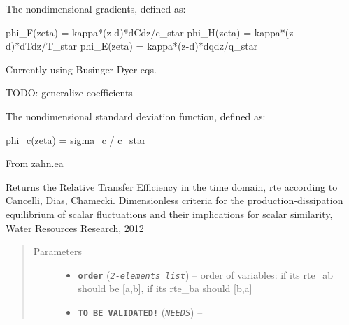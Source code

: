 \documentclass[a4paper,10pt,oneside]{sphinxmanual}
\begin{document}

\begin{fulllineitems}
\label{pymicra.micro:pymicra.micro.functions.nondimensionalGrad}
The nondimensional gradients, defined as:

phi\_F(zeta) = kappa*(z-d)*dCdz/c\_star
phi\_H(zeta) = kappa*(z-d)*dTdz/T\_star
phi\_E(zeta) = kappa*(z-d)*dqdz/q\_star

Currently using Businger-Dyer eqs.

TODO: generalize coefficients

\end{fulllineitems}


\begin{fulllineitems}
\label{pymicra.micro:pymicra.micro.functions.nondimensionalSTD}
The nondimensional standard deviation function, defined as:

phi\_c(zeta) = sigma\_c / c\_star

From zahn.ea

\end{fulllineitems}


\begin{fulllineitems}
\label{pymicra.micro:pymicra.micro.functions.rte}
Returns the Relative Transfer Efficiency in the time domain, rte
according to Cancelli, Dias, Chamecki. Dimensionless criteria for the production-dissipation equilibrium
of scalar fluctuations and their implications for scalar similarity, Water Resources Research, 2012
\begin{quote}\begin{description}
\item[{Parameters}] \leavevmode\begin{itemize}
\item {} 
\textbf{\texttt{order}} (\emph{\texttt{2-elements list}}) -- order of variables: if its rte\_ab should be {[}a,b{]}, if its rte\_ba should {[}b,a{]}

\item {} 
\textbf{\texttt{TO BE VALIDATED!}} (\emph{\texttt{NEEDS}}) -- 

\end{itemize}

\end{description}\end{quote}

\end{fulllineitems}
\end{document}
